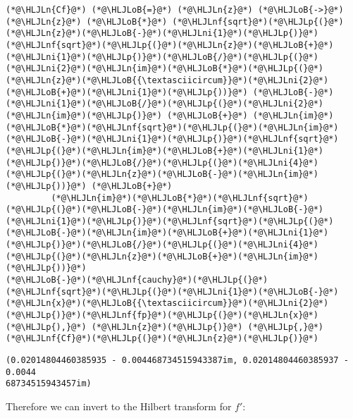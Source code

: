 \documentclass[12pt,landscape]{article}
\newcommand{\HLJLn}[1]{#1}
\newcommand{\HLJLnf}[1]{\textcolor[RGB]{66,102,213}{#1}}
\newcommand{\HLJLni}[1]{\textcolor[RGB]{59,151,46}{#1}}
\newcommand{\HLJLoB}[1]{\textcolor[RGB]{102,102,102}{\textbf{#1}}}
\newcommand{\HLJLp}[1]{#1}
\begin{document}
{\begin{lstlisting}
(*@\HLJLn{Cf}@*) (*@\HLJLoB{=}@*) (*@\HLJLn{z}@*) (*@\HLJLoB{->}@*) (*@\HLJLn{z}@*) (*@\HLJLoB{*}@*) (*@\HLJLnf{sqrt}@*)(*@\HLJLp{(}@*)(*@\HLJLn{z}@*)(*@\HLJLoB{-}@*)(*@\HLJLni{1}@*)(*@\HLJLp{)}@*)(*@\HLJLnf{sqrt}@*)(*@\HLJLp{(}@*)(*@\HLJLn{z}@*)(*@\HLJLoB{+}@*)(*@\HLJLni{1}@*)(*@\HLJLp{)}@*)(*@\HLJLoB{/}@*)(*@\HLJLp{(}@*)(*@\HLJLni{2}@*)(*@\HLJLn{im}@*)(*@\HLJLoB{*}@*)(*@\HLJLp{(}@*)(*@\HLJLn{z}@*)(*@\HLJLoB{{\textasciicircum}}@*)(*@\HLJLni{2}@*)(*@\HLJLoB{+}@*)(*@\HLJLni{1}@*)(*@\HLJLp{))}@*) (*@\HLJLoB{-}@*) (*@\HLJLni{1}@*)(*@\HLJLoB{/}@*)(*@\HLJLp{(}@*)(*@\HLJLni{2}@*)(*@\HLJLn{im}@*)(*@\HLJLp{)}@*) (*@\HLJLoB{+}@*) (*@\HLJLn{im}@*)(*@\HLJLoB{*}@*)(*@\HLJLnf{sqrt}@*)(*@\HLJLp{(}@*)(*@\HLJLn{im}@*)(*@\HLJLoB{-}@*)(*@\HLJLni{1}@*)(*@\HLJLp{)}@*)(*@\HLJLnf{sqrt}@*)(*@\HLJLp{(}@*)(*@\HLJLn{im}@*)(*@\HLJLoB{+}@*)(*@\HLJLni{1}@*)(*@\HLJLp{)}@*)(*@\HLJLoB{/}@*)(*@\HLJLp{(}@*)(*@\HLJLni{4}@*)(*@\HLJLp{(}@*)(*@\HLJLn{z}@*)(*@\HLJLoB{-}@*)(*@\HLJLn{im}@*)(*@\HLJLp{))}@*) (*@\HLJLoB{+}@*)
         (*@\HLJLn{im}@*)(*@\HLJLoB{*}@*)(*@\HLJLnf{sqrt}@*)(*@\HLJLp{(}@*)(*@\HLJLoB{-}@*)(*@\HLJLn{im}@*)(*@\HLJLoB{-}@*)(*@\HLJLni{1}@*)(*@\HLJLp{)}@*)(*@\HLJLnf{sqrt}@*)(*@\HLJLp{(}@*)(*@\HLJLoB{-}@*)(*@\HLJLn{im}@*)(*@\HLJLoB{+}@*)(*@\HLJLni{1}@*)(*@\HLJLp{)}@*)(*@\HLJLoB{/}@*)(*@\HLJLp{(}@*)(*@\HLJLni{4}@*)(*@\HLJLp{(}@*)(*@\HLJLn{z}@*)(*@\HLJLoB{+}@*)(*@\HLJLn{im}@*)(*@\HLJLp{))}@*)
(*@\HLJLoB{-}@*)(*@\HLJLnf{cauchy}@*)(*@\HLJLp{(}@*)(*@\HLJLnf{sqrt}@*)(*@\HLJLp{(}@*)(*@\HLJLni{1}@*)(*@\HLJLoB{-}@*)(*@\HLJLn{x}@*)(*@\HLJLoB{{\textasciicircum}}@*)(*@\HLJLni{2}@*)(*@\HLJLp{)}@*)(*@\HLJLnf{fp}@*)(*@\HLJLp{(}@*)(*@\HLJLn{x}@*)(*@\HLJLp{),}@*) (*@\HLJLn{z}@*)(*@\HLJLp{)}@*) (*@\HLJLp{,}@*) (*@\HLJLnf{Cf}@*)(*@\HLJLp{(}@*)(*@\HLJLn{z}@*)(*@\HLJLp{)}@*)
\end{lstlisting}

\begin{lstlisting}
(0.02014804460385935 - 0.004468734515943387im, 0.02014804460385937 - 0.0044
68734515943457im)
\end{lstlisting}


Therefore we can invert to the Hilbert transform for $f'$:


}
\end{document}
